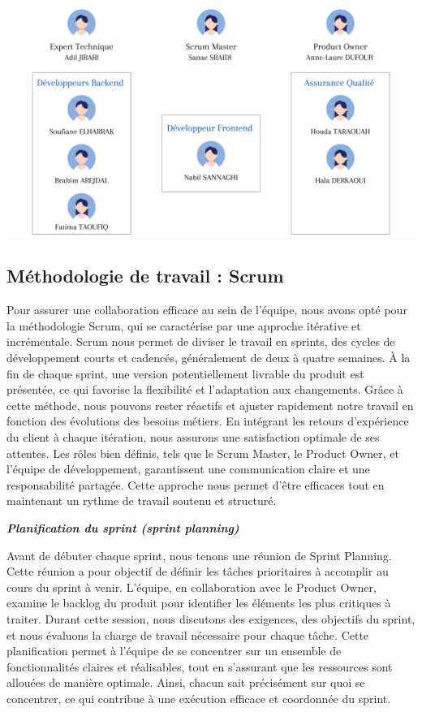 \begin{center}
    \centering
    \includegraphics[width=19cm]{Figures/Cart Checkout & Payment.png}
    \label{fig:structure_payment}
\end{center}


\subsection{Méthodologie de travail : Scrum}

Pour assurer une collaboration efficace au sein de l'équipe, nous avons opté pour la méthodologie Scrum, qui se caractérise par une approche itérative et incrémentale. Scrum nous permet de diviser le travail en sprints, des cycles de développement courts et cadencés, généralement de deux à quatre semaines. À la fin de chaque sprint, une version potentiellement livrable du produit est présentée, ce qui favorise la flexibilité et l'adaptation aux changements. Grâce à cette méthode, nous pouvons rester réactifs et ajuster rapidement notre travail en fonction des évolutions des besoins métiers. En intégrant les retours d'expérience du client à chaque itération, nous assurons une satisfaction optimale de ses attentes. Les rôles bien définis, tels que le Scrum Master, le Product Owner, et l'équipe de développement, garantissent une communication claire et une responsabilité partagée. Cette approche nous permet d'être efficaces tout en maintenant un rythme de travail soutenu et structuré.


\textbf{\textbullet \textit{Planification du sprint (sprint planning)}}

Avant de débuter chaque sprint, nous tenons une réunion de Sprint Planning. Cette réunion a pour objectif de définir les tâches prioritaires à accomplir au cours du sprint à venir. L'équipe, en collaboration avec le Product Owner, examine le backlog du produit pour identifier les éléments les plus critiques à traiter. Durant cette session, nous discutons des exigences, des objectifs du sprint, et nous évaluons la charge de travail nécessaire pour chaque tâche. Cette planification permet à l'équipe de se concentrer sur un ensemble de fonctionnalités claires et réalisables, tout en s'assurant que les ressources sont allouées de manière optimale. Ainsi, chacun sait précisément sur quoi se concentrer, ce qui contribue à une exécution efficace et coordonnée du sprint.

